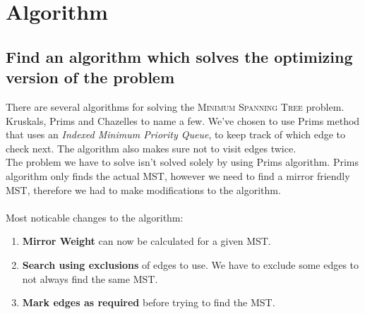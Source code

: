 \documentclass[12pt]{report}
\begin{document}
\chapter{Algorithm}
\section{Find an algorithm which solves the optimizing version of the problem}
\label{sec:alg1}
There are several algorithms for solving the \textsc{Minimum Spanning Tree} problem.  Kruskals, Prims and Chazelles to name a few. We've chosen to use Prims method that uses an \emph{Indexed Minimum Priority Queue}, to keep track of which edge to check next. The algorithm also makes sure not to visit edges twice.\\
The problem we have to solve isn't solved solely by using Prims algorithm. Prims algorithm only finds the actual MST, however we need to find a mirror friendly MST, therefore we had to make modifications to the algorithm.\\
\\
Most noticable changes to the algorithm:
\begin{enumerate}
	\item[] \textbf{Mirror Weight} can now be calculated for a given MST.
	\item[] \textbf{Search using exclusions} of edges to use. We have to exclude some edges to not always find the same MST.
	\item[] \textbf{Mark edges as required} before trying to find the MST.
\end{enumerate}
\end{document}
